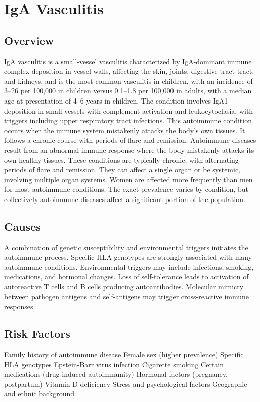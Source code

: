 \chapter{IgA Vasculitis}
\label{sec:IgA Vasculitis (Henoch-Schönlein Purpura)}

\section{Overview}
IgA vasculitis is a small-vessel vasculitis characterized by IgA-dominant immune complex deposition in vessel walls, affecting the skin, joints, digestive tract tract, and kidneys, and is the most common vasculitis in children, with an incidence of 3--26 per 100,000 in children versus 0.1--1.8 per 100,000 in adults, with a median age at presentation of 4--6 years in children. The condition involves IgA1 deposition in small vessels with complement activation and leukocytoclasia, with triggers including upper respiratory tract infections. This autoimmune condition occurs when the immune system mistakenly attacks the body's own tissues. It follows a chronic course with periods of flare and remission. Autoimmune diseases result from an abnormal immune response where the body mistakenly attacks its own healthy tissues. These conditions are typically chronic, with alternating periods of flare and remission. They can affect a single organ or be systemic, involving multiple organ systems. Women are affected more frequently than men for most autoimmune conditions. The exact prevalence varies by condition, but collectively autoimmune diseases affect a significant portion of the population.
\section{Causes}
A combination of genetic susceptibility and environmental triggers initiates the autoimmune process. Specific HLA genotypes are strongly associated with many autoimmune conditions. Environmental triggers may include infections, smoking, medications, and hormonal changes. Loss of self-tolerance leads to activation of autoreactive T cells and B cells producing autoantibodies. Molecular mimicry between pathogen antigens and self-antigens may trigger cross-reactive immune responses.
\section{Risk Factors}
Family history of autoimmune disease Female sex (higher prevalence) Specific HLA genotypes Epstein-Barr virus infection Cigarette smoking Certain medications (drug-induced autoimmunity) Hormonal factors (pregnancy, postpartum) Vitamin D deficiency Stress and psychological factors Geographic and ethnic background

